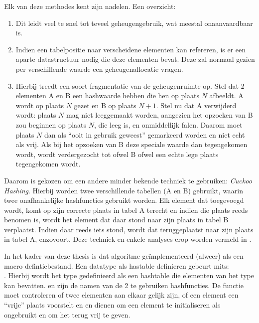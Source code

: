 {Elk van deze methodes kent zijn nadelen. Een overzicht: \begin{enumerate}
\item Dit leidt veel te snel tot teveel geheugengebruik, wat meestal onaanvaardbaar is.
\item Indien een tabelpositie naar verscheidene elementen kan refereren, is er een aparte datastructuur nodig die deze elementen bevat. Deze zal normaal gezien per verschillende waarde een geheugenallocatie vragen. 
\item Hierbij treedt een soort fragmentatie van de geheugenruimte op. Stel dat 2 elementen A en B een hashwaarde hebben die hen op plaats $N$ afbeeldt. A wordt op plaats $N$ gezet en B op plaats $N+1$. Stel nu dat A verwijderd wordt: plaats $N$ mag niet leeggemaakt worden, aangezien het opzoeken van B zou beginnen op plaats $N$, die leeg is, en onmiddellijk falen. Daarom moet plaats $N$ dan als ``ooit in gebruik geweest'' gemarkeerd worden en niet echt als vrij. Als bij het opzoeken van B deze speciale waarde dan tegengekomen wordt, wordt verdergezocht tot ofwel B ofwel een echte lege plaats tegengekomen wordt.
\end{enumerate}

Daarom is gekozen om een andere minder bekende techniek te gebruiken: {\em Cuckoo Hashing}. Hierbij worden twee verschillende tabellen (A en B) gebruikt, waarin twee onafhankelijke hashfuncties gebruikt worden. Elk element dat toegevoegd wordt, komt op zijn correcte plaats in tabel A terecht en indien die plaats reeds benomen is, wordt het element dat daar stond naar zijn plaats in tabel B verplaatst. Indien daar reeds iets stond, wordt dat teruggeplaatst naar zijn plaats in tabel A, enzovoort. Deze techniek en enkele analyses erop worden vermeld in \cite{cuckoo}.

In het kader van deze thesis is dat algoritme ge\"implementeerd (alweer) als een macro defintiebestand. Een datatype als hastable definieren gebeurt mits: \\
. Hierbij wordt het type  gedefinieerd als een hashtable die elementen van het type  kan bevatten.  en  zijn de namen van de 2 te gebruiken hashfuncties. De functie  moet controleren of twee elementen aan elkaar gelijk zijn,  of een element een ``vrije'' plaats voorstelt en  en  dienen om een element te initialiseren als ongebruikt en om het terug vrij te geven.

}
